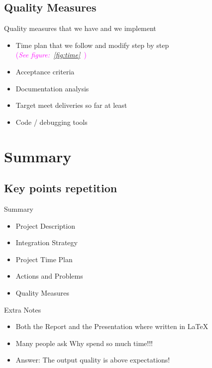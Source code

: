\documentclass[xcolor=pdftex,dvipsnames,table]{beamer}
\begin{document}
\subsection{Quality Measures}
\begin{frame}
  \begin{exampleblock}{Quality measures that we have and we implement}
    \begin{itemize}[<+->]
      \item Time plan that we follow and modify step by step\\
       \textcolor{magenta}{(\emph{{See figure:~\ref{fig:time}~}})}
      \item Acceptance criteria
      \item Documentation analysis
      \item Target meet deliveries so far at least
      \item Code / debugging tools
    \end{itemize}
  \end{exampleblock}
\end{frame}

\section{Summary}
  \subsection{Key points repetition}
  
\begin{frame}
  \begin{exampleblock}{Summary}
    \begin{itemize}[<+->]
      \item Project Description
      \item Integration Strategy
      \item Project Time Plan
      \item Actions and Problems
      \item Quality Measures \\ \pause
    \end{itemize}
  \end{exampleblock}
  \begin{exampleblock}{Extra Notes}
    \begin{itemize}[<+->]
      \item Both the Report and the Presentation where written in \LaTeX
      \item Many people ask \alert{Why spend so much time!!!}
      \item \alert{Answer:} The output quality is above expectations!
    \end{itemize}
  \end{exampleblock}
\end{frame}
\end{document}
